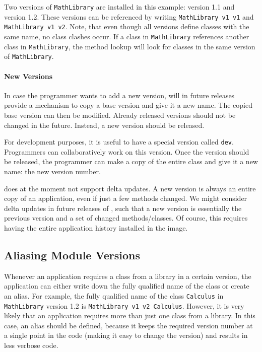 Two versions of \texttt{MathLibrary} are installed in this example: version 1.1 and version 1.2. These versions can be referenced by writing \texttt{MathLibrary v1 v1} and \texttt{MathLibrary v1 v2}. Note, that even though all versions define classes with the same name, no class clashes occur. If a class in \texttt{MathLibrary} references another class in \texttt{MathLibrary}, the method lookup will look for classes in the same version of \texttt{MathLibrary}.

\paragraph{New Versions}
In case the programmer wants to add a new version, \msname will in future releases provide a mechanism to copy a base version and give it a new name. The copied base version can then be modified. Already released versions should not be changed in the future. Instead, a new version should be released.

For development purposes, it is useful to have a special version called \texttt{dev}. Programmers can collaboratively work on this version. Once the version should be released, the programmer can make a copy of the entire class and give it a new name: the new version number.

\msname does at the moment not support delta updates. A new version is always an entire copy of an application, even if just a few methods changed. We might consider delta updates in future releases of \msname, such that a new version is essentially the previous version and a set of changed methods/classes. Of course, this requires having the entire application history installed in the image.

\subsection{Aliasing Module Versions}
Whenever an application requires a class from a library in a certain version, the application can either write down the fully qualified name of the class or create an alias. For example, the fully qualified name of the class \texttt{Calculus} in \texttt{MathLibrary} version 1.2 is \texttt{MathLibrary v1 v2 Calculus}. However, it is very likely that an application requires more than just one class from a library. In this case, an alias should be defined, because it keeps the required version number at a single point in the code (making it easy to change the version) and results in less verbose code.

